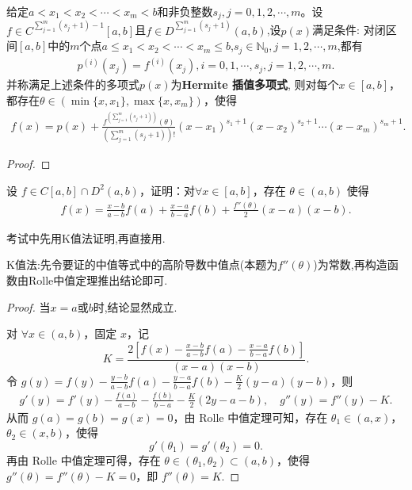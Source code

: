 \documentclass[../../main.tex]{subfiles}
\begin{document}
\begin{theorem}[Hermite插值定理]\label{theorem:Hermite插值定理}
给定\(a < x_1 < x_2 < \cdots < x_m < b\)和非负整数\(s_j,j = 0,1,2,\cdots,m\)。设\(f \in C^{\sum\limits_{j = 1}^{m}(s_j + 1)-1}[a,b]\)且\(f \in D^{\sum\limits_{j = 1}^{m}(s_j + 1)}(a,b)\),设\(p(x)\)满足条件:
对闭区间\([a,b]\)中的\(m\)个点\(a \leq x_1 < x_2 < \cdots < x_m \leq b\),\(s_j \in \mathbb{N}_0,j = 1,2,\cdots,m\),都有
\begin{align*}
p^{(i)}(x_j)=f^{(i)}(x_j),i = 0,1,\cdots,s_j,j = 1,2,\cdots,m.
\end{align*}
并称满足上述条件的多项式$p(x)$为\textbf{Hermite 插值多项式},
则对每个\(x \in [a,b]\)，都存在\(\theta \in (\min\{x,x_1\},\max\{x,x_m\})\)，使得
\begin{align*}
f(x)=p(x)+\frac{f^{(\sum\limits_{j = 1}^{m}(s_j + 1))}(\theta)}{\left(\sum\limits_{j = 1}^{m}(s_j + 1)\right)!}(x - x_1)^{s_1 + 1}(x - x_2)^{s_2 + 1}\cdots(x - x_m)^{s_m + 1}.
\end{align*}
\end{theorem}
\begin{proof}

\end{proof}

\begin{proposition}[Lagrange插值公式]\label{proposition:Lagrange插值公式}
设 $f \in C[a, b] \cap D^2(a, b)$，证明：对$\forall x \in [a, b]$，存在 $\theta \in (a, b)$ 使得
\begin{align*}
f(x) = \frac{x - b}{a - b} f(a) + \frac{x - a}{b - a} f(b) + \frac{f''(\theta)}{2} (x - a)(x - b).
\end{align*}
\end{proposition}
\begin{remark}
考试中先用K值法证明,再直接用.
\end{remark}
\begin{note}
K值法:先令要证的中值等式中的高阶导数中值点(本题为$f''(\theta)$)为常数,再构造函数由Rolle中值定理推出结论即可.
\end{note}
\begin{proof}
当$x=a$或$b$时,结论显然成立.

对 $\forall x\in (a,b)$，固定 $x$，记
\[
K=\frac{2\left[ f(x) -\frac{x-b}{a-b}f(a) -\frac{x-a}{b-a}f(b) \right]}{\left( x-a \right) \left( x-b \right)}.
\]
令 $g(y) =f(y) -\frac{y-b}{a-b}f(a) -\frac{y-a}{b-a}f(b) -\frac{K}{2}\left( y-a \right) \left( y-b \right)$，则
\begin{align*}
g'(y) = f'(y) -\frac{f(a)}{a-b}-\frac{f(b)}{b-a}-\frac{K}{2}\left( 2y-a-b \right),\quad 
g''(y) = f''(y) -K.
\end{align*}
从而 $g(a) = g(b) = g(x) = 0$，由 Rolle 中值定理可知，存在 $\theta_1 \in (a,x)$，$\theta_2 \in (x,b)$，使得
\[
g'(\theta_1) = g'(\theta_2) = 0.
\]
再由 Rolle 中值定理可得，存在 $\theta \in (\theta_1, \theta_2) \subset (a,b)$，使得 $g''(\theta) = f''(\theta) - K = 0$，即 $f''(\theta) = K$.
\end{proof}
\end{document}
